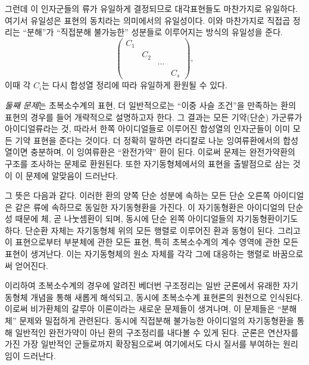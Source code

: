 그런데 이 인자군들의 류가 유일하게 결정되므로 대각표현들도 마찬가지로 유일하다. 여기서 유일성은 표현의 동치라는 의미에서의 유일성이다. 이와 마찬가지로 직접곱 정리는 ``분해''가 ``직접분해 불가능한'' 성분들로 이루어지는 방식의 유일성을 준다.
\[
\begin{pmatrix}
C_1&&&\\
&C_2&&\\
&&\cdots&\\
&&&C_s
\end{pmatrix},
\]
이때 각 $C_i$는 다시 합성열 정리에 따라 유일하게 환원될 수 있다.

\emph{둘째 문제}는 초복소수계의 표현, 더 일반적으로는 ``이중 사슬 조건''을 만족하는 환의 표현의 경우를 들어 개략적으로 설명하고자 한다. 그 결과는 모든 기약(단순) 가군류가 아이디얼류라는 것, 따라서 한쪽 아이디얼들로 이루어진 합성열의 인자군들이 이미 모든 기약 표현을 준다는 것이다. 더 정확히 말하면 라디칼로 나눈 잉여류환에서의 합성열이면 충분하며, 이 잉여류환은 ``완전가약'' 환이 된다. 이로써 문제는 완전가약환의 구조를 조사하는 문제로 환원된다. 또한 자기동형체에서의 표현을 출발점으로 삼는 것이 이 문제에 알맞음이 드러난다.

그 뜻은 다음과 같다. 이러한 환의 양쪽 단순 성분에 속하는 모든 단순 오른쪽 아이디얼은 같은 류에 속하므로 동일한 자기동형환을 가진다. 이 자기동형환은 아이디얼의 단순성 때문에 체, 곧 나눗셈환이 되며, 동시에 단순 왼쪽 아이디얼들의 자기동형환이기도 하다. 단순환 자체는 자기동형체 위의 모든 행렬로 이루어진 환과 동형이 된다. 그리고 이 표현으로부터 부분체에 관한 모든 표현, 특히 초복소수계의 계수 영역에 관한 모든 표현이 생겨난다. 이는 자기동형체의 원소 자체를 각각 그에 대응하는 행렬로 바꿈으로써 얻어진다.

이리하여 초복소수계의 경우에 알려진 베더번 구조정리는 일반 군론에서 유래한 자기동형체 개념을 통해 새롭게 해석되고, 동시에 초복소수계 표현론의 원천으로 인식된다. 이로써 비가환체의 갈루아 이론이라는 새로운 문제들이 생겨나며, 이 문제들은 ``분해체'' 문제와 밀접하게 관련된다. 동시에 직접분해 불가능한 아이디얼의 자기동형환을 통해 일반적인 완전가약이 아닌 환의 구조정리를 내다볼 수 있게 된다. 군론은 연산자를 가진 가장 일반적인 군들로까지 확장됨으로써 여기에서도 다시 질서를 부여하는 원리임이 드러난다.

\endgroup

